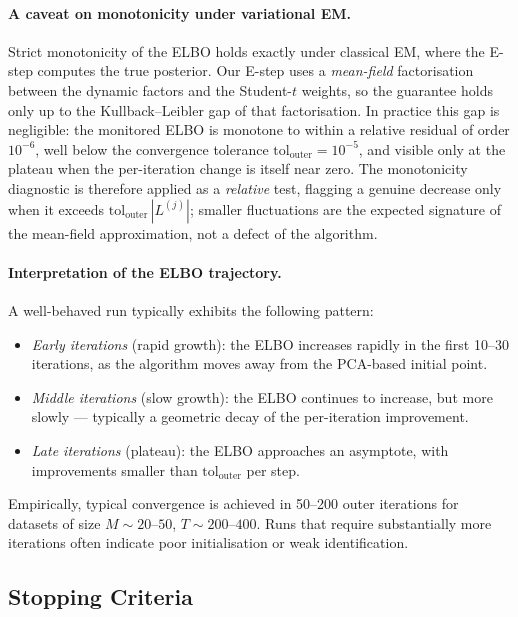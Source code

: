 \documentclass[11pt, a4paper, oneside]{article}
\begin{document}
\paragraph{A caveat on monotonicity under variational EM.}
Strict monotonicity of the ELBO holds exactly under classical EM,
where the E-step computes the true posterior. Our E-step uses a
\emph{mean-field} factorisation between the dynamic factors and the
Student-$t$ weights, so the guarantee holds only up to the
Kullback--Leibler gap of that factorisation. In practice this gap is
negligible: the monitored ELBO is monotone to within a relative
residual of order $10^{-6}$, well below the convergence tolerance
$\mathrm{tol}_{\text{outer}} = 10^{-5}$, and visible only at the
plateau when the per-iteration change is itself near zero. The
monotonicity diagnostic is therefore applied as a \emph{relative}
test, flagging a genuine decrease only when it exceeds
$\mathrm{tol}_{\text{outer}}\,|L^{(j)}|$; smaller fluctuations are the
expected signature of the mean-field approximation, not a defect of
the algorithm.

\paragraph{Interpretation of the ELBO trajectory.}
A well-behaved run typically exhibits the following pattern:
\begin{itemize}[leftmargin=1.5em, itemsep=3pt]
    \item \emph{Early iterations} (rapid growth): the ELBO increases
          rapidly in the first 10--30 iterations, as the algorithm
          moves away from the PCA-based initial point.
    \item \emph{Middle iterations} (slow growth): the ELBO
          continues to increase, but more slowly — typically a
          geometric decay of the per-iteration improvement.
    \item \emph{Late iterations} (plateau): the ELBO approaches an
          asymptote, with improvements smaller than
          $\mathrm{tol}_{\text{outer}}$ per step.
\end{itemize}
Empirically, typical convergence is achieved in 50--200 outer iterations
for datasets of size $M \sim 20$--$50$, $T \sim 200$--$400$. Runs that
require substantially more iterations often indicate poor
initialisation or weak identification.

\subsection{Stopping Criteria}
\label{subsec:stopping-criteria}
\end{document}

